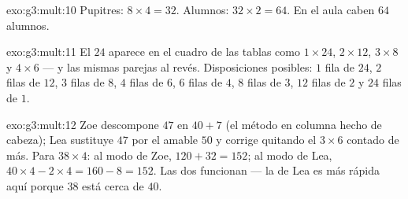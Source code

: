 \begin{solution}{exo:g3:mult:10}
Pupitres: $8 \times 4 = 32$. Alumnos: $32 \times 2 = 64$. En el aula caben
$64$ alumnos.
\end{solution}

\begin{solution}{exo:g3:mult:11}
El $24$ aparece en el cuadro de las tablas como $1 \times 24$, $2 \times 12$,
$3 \times 8$ y $4 \times 6$ --- y las mismas parejas al revés. Disposiciones
posibles: $1$ fila de $24$, $2$ filas de $12$, $3$ filas de $8$,
$4$ filas de $6$, $6$ filas de $4$, $8$ filas de $3$, $12$ filas de $2$
y $24$ filas de $1$.
\end{solution}

\begin{solution}{exo:g3:mult:12}
Zoe descompone $47$ en $40 + 7$ (el método en columna hecho de cabeza); Lea
sustituye $47$ por el amable $50$ y corrige quitando el
$3 \times 6$ contado de más. Para $38 \times 4$: al modo de Zoe,
$120 + 32 = 152$; al modo de Lea, $40 \times 4 - 2 \times 4 = 160 - 8 =
152$. Las dos funcionan --- la de Lea es más rápida aquí porque $38$ está cerca de
$40$.
\end{solution}
